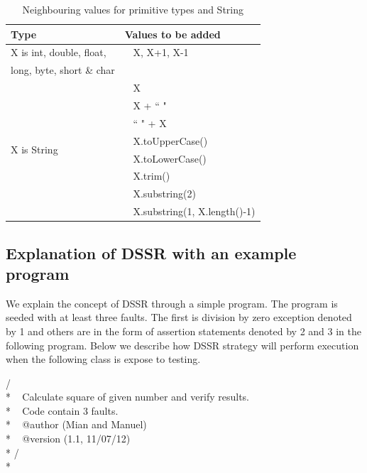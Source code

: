 \documentclass[conference]{IEEEtran}
\begin{document}
\begin{table}[ht]
\caption{Neighbouring values for primitive types and String} %
\centering %
\begin{tabular}{| l | l |} %
\hline\hline %
Type & Values to be added\\ [0.5ex] %
\hline %
\multirow{1}{*}{X is int, double, float, } & ~ X,  X+1, X-1 \\ %
\multirow{1}{*}{long, byte, short \& char} &  \\ 

\hline
\multirow{8}{*}{X is String} & ~ X\\ %

& ~ X + ``  "\\ %
& ~ ``  " + X \\ %
& ~ X.toUpperCase() \\
& ~ X.toLowerCase() \\
& ~ X.trim() \\
& ~ X.substring(2) \\
& ~ X.substring(1, X.length()-1) \\[1ex]
\hline
\hline %
\end{tabular}
\label{table:addvalues} %
\end{table}
\subsection{Explanation of DSSR with an example program}
We explain the concept of DSSR through a simple program. The program is seeded with at least three faults. The first is division by zero exception denoted by 1 and others are in the form of assertion statements denoted by 2 and 3 in the following program.  Below we describe how DSSR strategy will perform execution when the following class is expose to testing.\\


\begingroup

    \fontsize{7pt}{8pt}\selectfont
    
\noindent
/\textasteriskcentered \textasteriskcentered \\*
\textasteriskcentered   ~ Calculate square of given number and verify results. \\*
\textasteriskcentered   ~ Code contain 3 faults.\\*
\textasteriskcentered   ~ @author (Mian and Manuel) \\* 
\textasteriskcentered   ~ @version (1.1, 11/07/12)\\*
\textasteriskcentered / \\*
\end{document}
